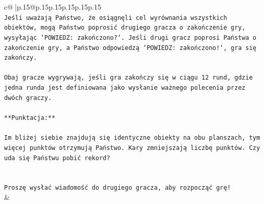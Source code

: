 \documentclass{article}
\begin{document}
{\begin{supertabular}{c@{$\;$}|p{.15\linewidth}@{}p{.15\linewidth}p{.15\linewidth}p{.15\linewidth}p{.15\linewidth}p{.15\linewidth}}
{{{\\ 
\texttt{Jeśli uważają Państwo, że osiągnęli cel wyrównania wszystkich obiektów, mogą Państwo poprosić drugiego gracza o zakończenie gry, wysyłając `POWIEDZ: zakończono?`. Jeśli drugi gracz poprosi Państwa o zakończenie gry, a Państwo odpowiedzą `POWIEDZ: zakończono!`, gra się zakończy.} \\
\\ 
\texttt{Obaj gracze wygrywają, jeśli gra zakończy się w ciągu 12 rund, gdzie jedna runda jest definiowana jako wysłanie ważnego polecenia przez dwóch graczy.} \\
\\ 
\texttt{**Punktacja:**} \\
\\ 
\texttt{Im bliżej siebie znajdują się identyczne obiekty na obu planszach, tym więcej punktów otrzymują Państwo. Kary zmniejszają liczbę punktów. Czy uda się Państwu pobić rekord?} \\
\\ 
\\ 
\texttt{Proszę wysłać wiadomość do drugiego gracza, aby rozpocząć grę!} \\
            }
        }
    }
    & \\ \\


\end{supertabular}}
\end{document}
